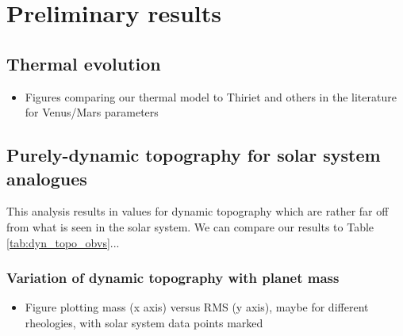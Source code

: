\section{Preliminary results}

\subsection{Thermal evolution}

\begin{itemize}
\item Figures comparing our thermal model to Thiriet and others in the literature for Venus/Mars parameters
\end{itemize}

\subsection{Purely-dynamic topography for solar system analogues}

This analysis results in values for dynamic topography which are rather far off from what is seen in the solar system. We can compare our results to Table \ref{tab:dyn_topo_obvs}...


\subsubsection{Variation of dynamic topography with planet mass}

\begin{itemize}
\item Figure plotting mass (x axis) versus RMS (y axis), maybe for different rheologies, with solar system data points marked
\end{itemize}